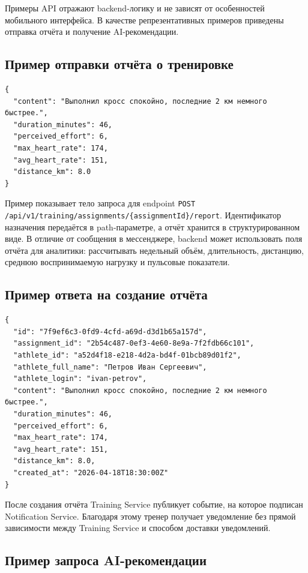 
Примеры API отражают backend-логику и не зависят от особенностей мобильного интерфейса. В качестве репрезентативных примеров приведены отправка отчёта и получение AI-рекомендации.

\subsection*{Пример отправки отчёта о тренировке}

\begin{lstlisting}
{
  "content": "Выполнил кросс спокойно, последние 2 км немного быстрее.",
  "duration_minutes": 46,
  "perceived_effort": 6,
  "max_heart_rate": 174,
  "avg_heart_rate": 151,
  "distance_km": 8.0
}
\end{lstlisting}

Пример показывает тело запроса для endpoint \passthrough{\lstinline!POST /api/v1/training/assignments/\{assignmentId\}/report!}. Идентификатор назначения передаётся в path-параметре, а отчёт хранится в структурированном виде. В отличие от сообщения в мессенджере, backend может использовать поля отчёта для аналитики: рассчитывать недельный объём, длительность, дистанцию, среднюю воспринимаемую нагрузку и пульсовые показатели.

\subsection*{Пример ответа на создание отчёта}

\begin{lstlisting}
{
  "id": "7f9ef6c3-0fd9-4cfd-a69d-d3d1b65a157d",
  "assignment_id": "2b54c487-0ef3-4e60-8e9a-7f2fdb66c101",
  "athlete_id": "a52d4f18-e218-4d2a-bd4f-01bcb89d01f2",
  "athlete_full_name": "Петров Иван Сергеевич",
  "athlete_login": "ivan-petrov",
  "content": "Выполнил кросс спокойно, последние 2 км немного быстрее.",
  "duration_minutes": 46,
  "perceived_effort": 6,
  "max_heart_rate": 174,
  "avg_heart_rate": 151,
  "distance_km": 8.0,
  "created_at": "2026-04-18T18:30:00Z"
}
\end{lstlisting}

После создания отчёта Training Service публикует событие, на которое подписан Notification Service. Благодаря этому тренер получает уведомление без прямой зависимости между Training Service и способом доставки уведомлений.

\subsection*{Пример запроса AI-рекомендации}

